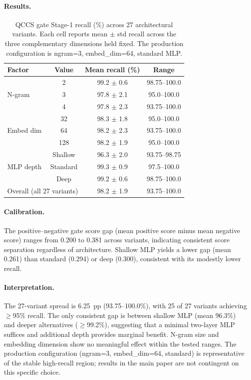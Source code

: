 \documentclass{article}
\begin{document}
\paragraph{Results.}

\begin{table}[H]
\centering
\caption{QCCS gate Stage-1 recall (\%) across 27 architectural variants.
  Each cell reports mean $\pm$ std recall across the three complementary
  dimensions held fixed. The production configuration is ngram=3,
  embed\_dim=64, standard MLP.}
\label{tab:gate_ablations}
\small
\begin{tabular}{@{}lccc@{}}
\toprule
Factor & Value & Mean recall (\%) & Range \\
\midrule
\multirow{3}{*}{N-gram}
  & 2 & 99.2 $\pm$ 0.6 & 98.75--100.0 \\
  & 3 & 97.8 $\pm$ 2.1 & 95.0--100.0 \\
  & 4 & 97.8 $\pm$ 2.3 & 93.75--100.0 \\
\midrule
\multirow{3}{*}{Embed dim}
  & 32  & 98.3 $\pm$ 1.8 & 95.0--100.0 \\
  & 64  & 98.2 $\pm$ 2.3 & 93.75--100.0 \\
  & 128 & 98.2 $\pm$ 1.9 & 95.0--100.0 \\
\midrule
\multirow{3}{*}{MLP depth}
  & Shallow  & 96.3 $\pm$ 2.0 & 93.75--98.75 \\
  & Standard & 99.3 $\pm$ 0.9 & 97.5--100.0 \\
  & Deep     & 99.2 $\pm$ 0.6 & 98.75--100.0 \\
\midrule
\multicolumn{2}{l}{Overall (all 27 variants)} & 98.2 $\pm$ 1.9 & 93.75--100.0 \\
\bottomrule
\end{tabular}
\end{table}

\paragraph{Calibration.}
The positive--negative gate score gap (mean positive score minus mean negative
score) ranges from 0.200 to 0.381 across variants, indicating consistent
score separation regardless of architecture. Shallow MLP yields a lower gap
(mean 0.261) than standard (0.294) or deep (0.300), consistent with its
modestly lower recall.

\paragraph{Interpretation.}
The 27-variant spread is 6.25~pp (93.75--100.0\%), with 25 of 27 variants
achieving $\geq$95\% recall. The only consistent gap is between shallow MLP
(mean 96.3\%) and deeper alternatives ($\geq$99.2\%), suggesting that a minimal
two-layer MLP suffices and additional depth provides marginal benefit. N-gram
size and embedding dimension show no meaningful effect within the tested ranges.
The production configuration (ngram=3, embed\_dim=64, standard) is representative
of the stable high-recall region; results in the main paper are not contingent
on this specific choice.
\end{document}
